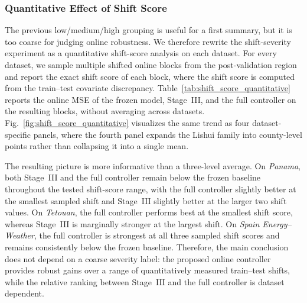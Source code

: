 ﻿\documentclass[journal]{IEEEtran}
\newenvironment{auditproblemblock}{\begingroup\color{red}}{\endgroup}
\begin{document}
\begin{auditproblemblock}
\subsubsection{Quantitative Effect of Shift Score}
The previous low/medium/high grouping is useful for a first summary, but it is too coarse for judging online robustness. We therefore rewrite the shift-severity experiment as a quantitative shift-score analysis on each dataset. For every dataset, we sample multiple shifted online blocks from the post-validation region and report the exact shift score of each block, where the shift score is computed from the train--test covariate discrepancy. Table~\ref{tab:shift_score_quantitative} reports the online MSE of the frozen model, Stage~III, and the full controller on the resulting blocks, without averaging across datasets. Fig.~\ref{fig:shift_score_quantitative} visualizes the same trend as four dataset-specific panels, where the fourth panel expands the Lishui family into county-level points rather than collapsing it into a single mean.

The resulting picture is more informative than a three-level average. On \textit{Panama}, both Stage~III and the full controller remain below the frozen baseline throughout the tested shift-score range, with the full controller slightly better at the smallest sampled shift and Stage~III slightly better at the larger two shift values. On \textit{Tetouan}, the full controller performs best at the smallest shift score, whereas Stage~III is marginally stronger at the largest shift. On \textit{Spain Energy--Weather}, the full controller is strongest at all three sampled shift scores and remains consistently below the frozen baseline. Therefore, the main conclusion does not depend on a coarse severity label: the proposed online controller provides robust gains over a range of quantitatively measured train--test shifts, while the relative ranking between Stage~III and the full controller is dataset dependent.


\end{auditproblemblock}
\end{document}
